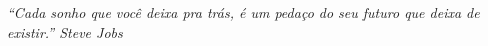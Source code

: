 \chapter*{}
\label{chp:dedicatoria}%
\thispagestyle{empty}

\null\vfill
\begin{flushright}
\emph{``Cada sonho que você deixa pra trás, é um pedaço do seu futuro que deixa de existir.'' Steve Jobs} 
\end{flushright}




































































































